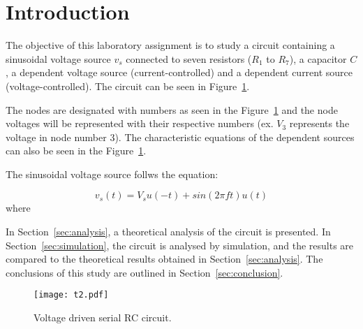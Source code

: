 \section{Introduction}
\label{sec:introduction}

The objective of this laboratory assignment is to study a circuit containing a
sinusoidal voltage source $v_s$ connected to seven resistors ($R_1$ to $R_7$), a capacitor $C$, a dependent voltage source (current-controlled) and a dependent current source (voltage-controlled).
The circuit can be seen in Figure~\ref{fig:t2}.

The nodes are designated with numbers as seen in the Figure~\ref{fig:t2} and the node voltages will be represented with their respective numbers (ex. $V_3$ represents the voltage in node number 3). The characteristic equations of the dependent sources can also be seen in the Figure~\ref{fig:t2}. 

The sinusoidal voltage source follws the equation:

\begin {equation}
	v_s( t )  = V_s u( -t ) + sin( 2 \pi f t ) u( t ) 
	\label{eq:vs}
\end{equation}
where 



In Section~\ref{sec:analysis}, a theoretical analysis of the circuit is
presented. In Section~\ref{sec:simulation}, the circuit is analysed by
simulation, and the results are compared to the theoretical results obtained in
Section~\ref{sec:analysis}. The conclusions of this study are outlined in
Section~\ref{sec:conclusion}.

\begin{figure}[h] \centering
\texttt{[image: t2.pdf]}
\caption{Voltage driven serial RC circuit.}
\label{fig:t2}
\end{figure}

